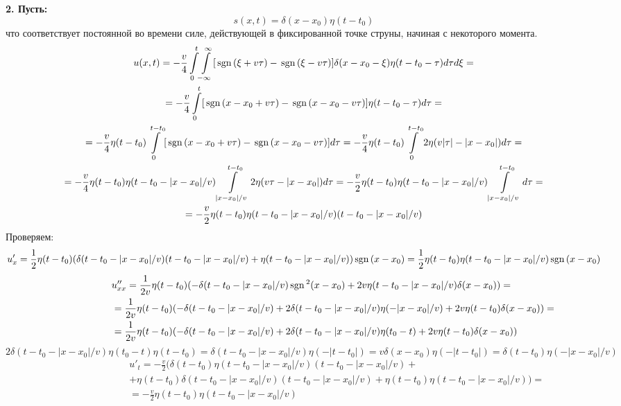\textbf{2. Пусть:}
\[
s(x, t) = \delta(x - x_0) \eta(t - t_0)
\]
что соответствует постоянной во времени силе, действующей в фиксированной точке струны, начиная с некоторого момента.
\[
\begin{gathered}
u(x, t) =
-\frac{v}{4} \int\limits_{0}^{t} \! \int\limits_{-\infty}^{\infty} [ \mathrm{\,sgn}\, (\xi + v \tau) - \mathrm{\,sgn}\, (\xi - v\tau) ]  \delta(x - x_0 - \xi) \eta(t - t_0 - \tau) d\tau d\xi =
\\ =
-\frac{v}{4} \int\limits_{0}^{t} [ \mathrm{\,sgn}\, (x - x_0 + v \tau) - \mathrm{\,sgn}\, (x - x_0 - v\tau) ] \eta (t - t_0 - \tau)  d\tau =
\\ =
-\frac{v}{4} \eta(t - t_0) \int\limits_{0}^{t - t_0} [ \mathrm{\,sgn}\, (x - x_0 + v \tau) - \mathrm{\,sgn}\, (x - x_0 - v\tau) ] d\tau = 
-\frac{v}{4} \eta(t - t_0) \int\limits_{0}^{t - t_0} 2 \eta(v|\tau| - |x - x_0|) d\tau =
\\ =
-\frac{v}{4} \eta(t - t_0) \eta(t - t_0 - |x - x_0|/v) \int\limits_{|x - x_0|/v}^{t - t_0} 2 \eta(v\tau - |x - x_0|) d\tau = 
-\frac{v}{2} \eta(t - t_0) \eta(t - t_0 - |x - x_0|/v) \int\limits_{|x - x_0|/v}^{t - t_0} d\tau =
\\ =
-\frac{v}{2} \eta(t - t_0) \eta(t - t_0 - |x - x_0|/v) (t - t_0 - |x - x_0|/v) 
\end{gathered}
\]
Проверяем:
\[
u'_x = \frac{1}{2} \eta(t - t_0) (\delta(t - t_0 - |x - x_0|/v)(t - t_0 - |x - x_0|/v) + \eta(t - t_0 - |x - x_0|/v) )\mathrm{\,sgn}\,(x - x_0) =
\frac{1}{2} \eta(t - t_0) \eta(t - t_0 - |x - x_0|/v) \mathrm{\,sgn}\,(x - x_0)
\]
\[
\begin{aligned}
& u''_{xx} = \frac{1}{2v} \eta(t - t_0) (- \delta(t - t_0 - |x - x_0|/v) \mathrm{\,sgn}\,^2(x - x_0) + 2 v \eta(t - t_0 - |x - x_0|/v) \delta(x - x_0)) = \\
\qquad\qquad\qquad&
= \frac{1}{2v} \eta(t - t_0) (- \delta(t - t_0 - |x - x_0|/v) + 2 \delta(t - t_0 - |x -x_0|/v)\eta(-|x - x_0|/v)  + 2 v \eta(t - t_0) \delta(x - x_0))
= \\
\qquad\qquad\qquad&
= \frac{1}{2v} \eta(t - t_0) (- \delta(t - t_0 - |x - x_0|/v) + 2 \delta(t - t_0 - |x -x_0|/v)\eta(t_0 - t)  + 2 v \eta(t - t_0) \delta(x - x_0))
\end{aligned}
\]
\[
 2 \delta(t - t_0 - |x -x_0|/v)\eta(t_0 - t)\eta(t - t_0) = \delta(t - t_0 - |x -x_0|/v)\eta(-|t -t_0|) = v \delta(x -x_0)\eta(-|t -t_0|) = \delta(t - t_0)\eta(- |x -x_0|/v)
\]
\[
\begin{aligned}
& u'_{t} = -\frac{v}{2} (\delta(t - t_0) \eta(t - t_0 - |x - x_0|/v) (t - t_0 - |x - x_0|/v) + 
\\ \qquad\qquad\qquad& + 
\eta(t - t_0) \delta(t - t_0 - |x - x_0|/v) (t - t_0 - |x - x_0|/v) + \eta(t - t_0) \eta(t - t_0 - |x - x_0|/v)) = \\
\qquad\qquad\qquad&
=  -\frac{v}{2} \eta(t - t_0) \eta(t - t_0 - |x - x_0|/v)
\end{aligned}
\]
